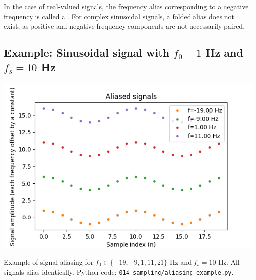 In the case of real-valued signals, the frequency alias corresponding to a negative frequency is called a \emph{}. 
For complex sinusoidal signals, a folded alias does not exist, as positive and negative frequency components are not necessarily paired.

\subsection{Example: Sinusoidal signal with $f_0=1$ Hz and $f_s=10$ Hz}
\begin{marginfigure}
  \begin{center}
    \includegraphics[width=\textwidth]{code/014_sampling/aliased_signals.png}
  \end{center}
  \caption{Example of signal aliasing for $f_0\in \{-19,-9,1,11,21\}$
    Hz and $f_s=10$ Hz. All signals alias identically. Python code:
    \texttt{014\_sampling/aliasing\_example.py}.}
\end{marginfigure}

